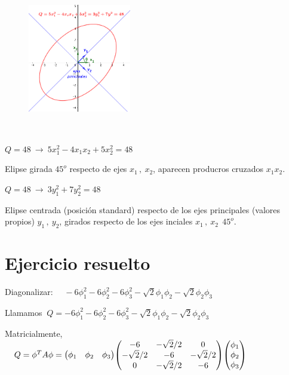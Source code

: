 \vspace{5mm}
\begin{multicols}{2}
\begin{figure}[H]
	\centering
	\includegraphics[width=0.4\textwidth]{imagenes/apendices-01-07.png}
\end{figure}
$\quad$

$Q=48 \ \to \  5x_1^2-4x_1x_2+5x_2^2=48\ $

Elipse girada $45^o$ respecto de ejes $x_1\, , \  x_2$, aparecen producros cruzados $x_1x_2$.

$Q=48 \ \to \  3y_1^2+7y_2^2=48\ $

Elipse centrada (posición standard) respecto de los ejes principales (valores propios) $y_1\, , \ y_2$, girados respecto de los ejes inciales $x_1\, , \  x_2\ \ 45^o$. 


\end{multicols}





\vspace{15mm}



\section{Ejercicio resuelto}
\begin{ejercicio}

Diagonalizar: $\quad -6\phi_1^2-6\phi_2^2-6\phi_3^2-\sqrt{2}\phi_1\phi_2	-\sqrt{2}\phi_2\phi_3$
\end{ejercicio}

\vspace{5mm}
\color{MidnightBlue}

Llamamos $\ Q=-6\phi_1^2-6\phi_2^2-6\phi_3^2-\sqrt{2}\phi_1\phi_2	-\sqrt{2}\phi_2\phi_3$

Matricialmente, $\quad Q=\phi^T A \phi =\mqty(\phi_1&\phi_2&\phi_3) \mqty(-6 &-\sqrt{2}/2 &0 \\ -\sqrt{2}/2&-6&-\sqrt{2}/2 \\ 0 & -\sqrt{2}/2&-6 ) \mqty(\phi_1 \\ \phi_2 \\ \phi_3)$

